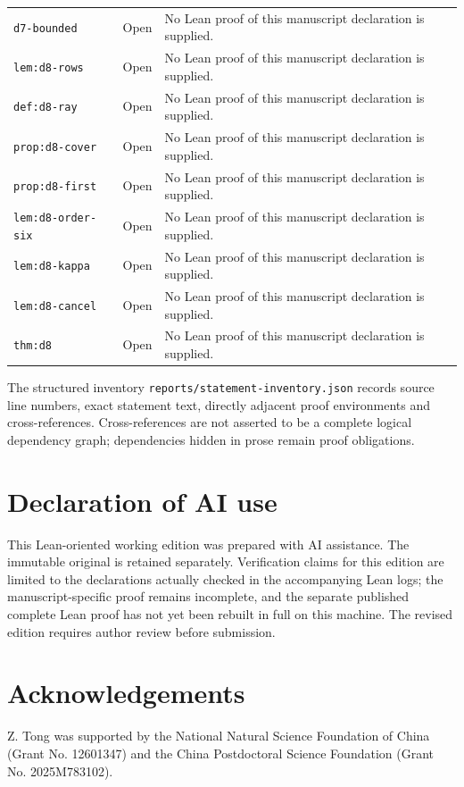\documentclass[Threeside,11pt]{article}
\theoremstyle{definition}
\theoremstyle{remark}
\numberwithin{equation}{section}
\theoremstyle{remark}
\newcommand{\code}[1]{\begingroup\def\_{\textunderscore\allowbreak}\texttt{#1}\endgroup}
\begin{document}
\begin{longtable}{p{4.0cm}p{1.8cm}p{8.9cm}}
\code{d7-bounded} & Open & No Lean proof of this manuscript declaration is supplied. \\
\code{lem:d8-rows} & Open & No Lean proof of this manuscript declaration is supplied. \\
\code{def:d8-ray} & Open & No Lean proof of this manuscript declaration is supplied. \\
\code{prop:d8-cover} & Open & No Lean proof of this manuscript declaration is supplied. \\
\code{prop:d8-first} & Open & No Lean proof of this manuscript declaration is supplied. \\
\code{lem:d8-order-six} & Open & No Lean proof of this manuscript declaration is supplied. \\
\code{lem:d8-kappa} & Open & No Lean proof of this manuscript declaration is supplied. \\
\code{lem:d8-cancel} & Open & No Lean proof of this manuscript declaration is supplied. \\
\code{thm:d8} & Open & No Lean proof of this manuscript declaration is supplied. \\
\bottomrule
\end{longtable}\endgroup

The structured inventory \code{reports/statement-inventory.json} records source
line numbers, exact statement text, directly adjacent proof environments and
cross-references. Cross-references are not asserted to be a complete logical
dependency graph; dependencies hidden in prose remain proof obligations.

\section*{Declaration of AI use}
This Lean-oriented working edition was prepared with AI assistance. The immutable original is retained separately. Verification claims for this edition are limited to the declarations actually checked in the accompanying Lean logs; the manuscript-specific proof remains incomplete, and the separate published complete Lean proof has not yet been rebuilt in full on this machine. The revised edition requires author review before submission.

\section*{Acknowledgements}
Z. Tong was supported by the National Natural Science Foundation of China
(Grant No. 12601347) and the China Postdoctoral Science Foundation
(Grant No. 2025M783102).
\end{document}
